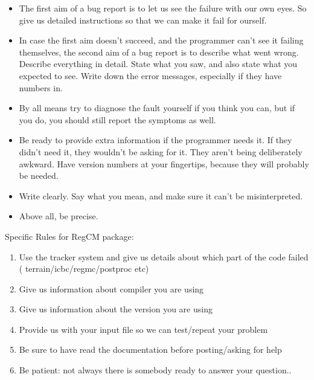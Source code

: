 \begin{itemize}
\item The first aim of a bug report is to let us see the failure with our own
eyes. So give us detailed instructions so that we can make it fail for ourself.
\item In case the first aim doesn't succeed, and the programmer can't see it
failing themselves, the second aim of a bug report is to describe what went
wrong. Describe everything in detail. State what you saw, and also state what
you expected to see. Write down the error messages, especially if they have
numbers in.
\item By all means try to diagnose the fault yourself if you think you can, but
if you do, you should still report the symptoms as well.
\item Be ready to provide extra information if the programmer needs it. If they
didn't need it, they wouldn't be asking for it. They aren't being deliberately
awkward. Have version numbers at your fingertips, because they will probably
be needed.
\item Write clearly. Say what you mean, and make sure it can't be
misinterpreted.
\item Above all, be precise.
\end{itemize}

Specific Rules for RegCM package:

\begin{enumerate}
\item Use the tracker system and give us details about which part of the code
failed ( terrain/icbc/regmc/postproc etc)
\item Give us information about compiler you are using
\item Give us information about the version you are using
\item Provide us with your input file so we can test/repeat your problem
\item Be sure to have read the documentation before posting/asking for help
\item Be patient: not  always there is somebody ready to answer your question..
\end{enumerate}

